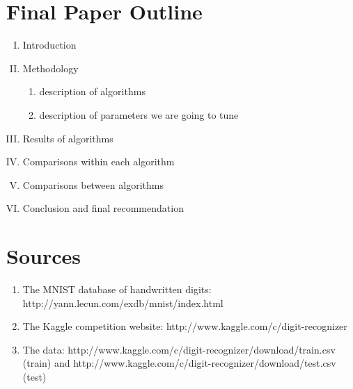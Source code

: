 \documentclass[11pt,a4paper]{article}
\begin{document}
\section*{Final Paper Outline}
\begin{enumerate}[I.]
\item Introduction
\item Methodology
\begin{enumerate}
\item description of algorithms
\item description of parameters we are going to tune
\end{enumerate}
\item Results of algorithms
\item Comparisons within each algorithm
\item Comparisons between algorithms
\item Conclusion and final recommendation
\end{enumerate}

\section*{Sources}
\begin{enumerate}
\item The MNIST database of handwritten digits: http://yann.lecun.com/exdb/mnist/index.html
\item The Kaggle competition website: http://www.kaggle.com/c/digit-recognizer 
\item The data:  http://www.kaggle.com/c/digit-recognizer/download/train.csv (train) and http://www.kaggle.com/c/digit-recognizer/download/test.csv (test)
\end{enumerate}
\end{document}

